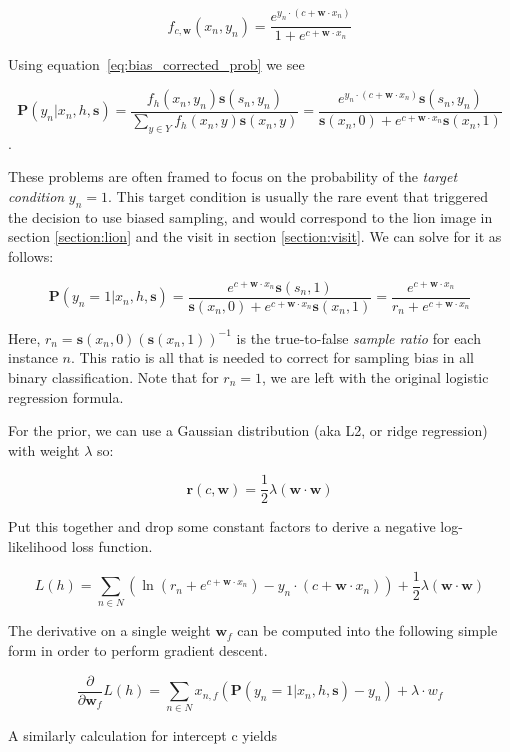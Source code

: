 \documentclass[twoside]{article}
\begin{document}
\[f_{c,\mathbf{w}}(x_n, y_n)=\frac{e^{y_n \cdot (c+\mathbf{w} \cdot x_n)}}{1+e^{c+\mathbf{w} \cdot x_n}}\]

Using equation~\eqref{eq:bias_corrected_prob} we see

\[\mathbf{P}(y_n|x_n,h,\mathbf{s})=\frac{f_h(x_n,y_n)\mathbf{s}(s_n,y_n)}{\sum_{y \in Y}f_h(x_n,y)\mathbf{s}(x_n,y)}=\frac{e^{y_n \cdot (c+\mathbf{w} \cdot x_n)}\mathbf{s}(s_n,y_n)}{\mathbf{s}(x_n,0)+e^{c+\mathbf{w} \cdot x_n}\mathbf{s}(x_n,1)} \].

These problems are often framed to focus on the probability of the \textit{target condition} \(y_n = 1\). This target condition is usually the rare event that triggered the decision to use biased sampling, and would correspond to the lion image in section \ref{section:lion} and the visit in section \ref{section:visit}. We can solve for it as follows:

\[\mathbf{P}(y_n=1|x_n,h,\mathbf{s})=\frac{e^{c+\mathbf{w} \cdot x_n}\mathbf{s}(s_n,1)}{\mathbf{s}(x_n,0)+e^{c+\mathbf{w} \cdot x_n}\mathbf{s}(x_n,1)}=\frac{e^{c+\mathbf{w} \cdot x_n}}{r_n+e^{c+\mathbf{w} \cdot x_n}} \]

Here, \(r_n = \mathbf{s}(x_n,0)(\mathbf{s}(x_n,1))^{-1}\) is the true-to-false \textit{sample ratio} for each instance \(n\). This ratio is all that is needed to correct for sampling bias in all binary classification. Note that for \(r_n=1\), we are left with the original logistic regression formula.

For the prior, we can use a Gaussian distribution (aka L2, or ridge regression) with weight \(\lambda\) so:

\[\mathbf{r}(c,\mathbf{w})=\frac{1}{2}\lambda(\mathbf{w} \cdot \mathbf{w})\]

Put this together and drop some constant factors to derive a negative log-likelihood loss function.

\[L(h)=\sum_{n \in  N} \left (\ln\left (r_n+e^{c+\mathbf{w} \cdot x_n}\right ) -y_n \cdot (c+\mathbf{w} \cdot x_n) \right )+ \frac{1}{2}\lambda(\mathbf{w} \cdot \mathbf{w})\]

The derivative on a single weight \(\mathbf{w}_f\) can be computed into the following simple form in order to perform gradient descent.

\[\frac{\partial}{\partial \mathbf{w}_f }L(h)=\sum_{n \in  N} x_{n,f}\left(\mathbf{P}(y_n=1|x_n,h,\mathbf{s}) -y_n  \right )+ \lambda \cdot w_f \]

A similarly calculation for intercept c yields
\end{document}
